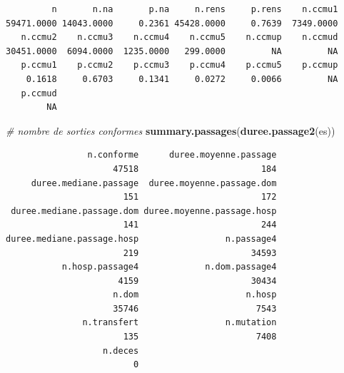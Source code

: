 \documentclass[]{article}
\newenvironment{Shaded}{\begin{snugshade}}{\end{snugshade}}
\newcommand{\KeywordTok}[1]{\textcolor[rgb]{0.13,0.29,0.53}{\textbf{{#1}}}}
\newcommand{\CommentTok}[1]{\textcolor[rgb]{0.56,0.35,0.01}{\textit{{#1}}}}
\newcommand{\NormalTok}[1]{{#1}}
\begin{document}
\begin{Shaded}
\end{Shaded}

\begin{verbatim}
         n       n.na       p.na     n.rens     p.rens    n.ccmu1 
59471.0000 14043.0000     0.2361 45428.0000     0.7639  7349.0000 
   n.ccmu2    n.ccmu3    n.ccmu4    n.ccmu5    n.ccmup    n.ccmud 
30451.0000  6094.0000  1235.0000   299.0000         NA         NA 
   p.ccmu1    p.ccmu2    p.ccmu3    p.ccmu4    p.ccmu5    p.ccmup 
    0.1618     0.6703     0.1341     0.0272     0.0066         NA 
   p.ccmud 
        NA 
\end{verbatim}

\begin{Shaded}
\begin{Highlighting}[]
    \CommentTok{# nombre de sorties conformes}
    \KeywordTok{summary.passages}\NormalTok{(}\KeywordTok{duree.passage2}\NormalTok{(es))}
\end{Highlighting}
\end{Shaded}

\begin{verbatim}
                n.conforme      duree.moyenne.passage 
                     47518                        184 
     duree.mediane.passage  duree.moyenne.passage.dom 
                       151                        172 
 duree.mediane.passage.dom duree.moyenne.passage.hosp 
                       141                        244 
duree.mediane.passage.hosp                 n.passage4 
                       219                      34593 
           n.hosp.passage4             n.dom.passage4 
                      4159                      30434 
                     n.dom                     n.hosp 
                     35746                       7543 
               n.transfert                 n.mutation 
                       135                       7408 
                   n.deces 
                         0 
\end{verbatim}

\begin{Shaded}
\end{Shaded}
\end{document}
